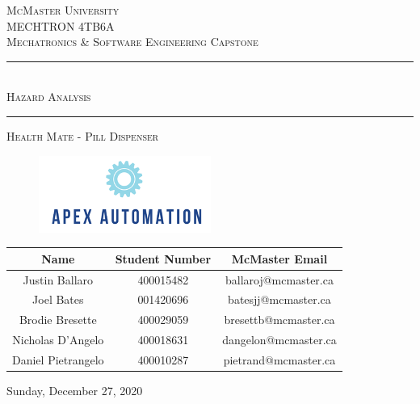 \documentclass[12pt,titlepage]{article}
\begin{document}
\begin{titlepage}

\newcommand{\HRule}{\rule{\linewidth}{0.5mm}} %

\center %
 

\textsc{\LARGE McMaster University}\\[1.5cm] %
\textsc{\Large MECHTRON 4TB6A}\\[0.5cm] %
\textsc{\large Mechatronics \& Software Engineering Capstone}\\[0.5cm] %

\vspace{1cm}
\HRule \\[0.2cm]
{ \Large \vspace{0.25cm}  \textsc{  \LARGE Hazard Analysis } \vspace{0.3cm} }  %
\HRule \vspace{1cm}

\textsc{\LARGE Health Mate - Pill Dispenser}
 
 \begin{figure}[h]
  \centering
  \includegraphics[width=.4\linewidth]{../ApexEngineering.png}
\end{figure}
 \vspace{1cm}
 

\begin{table}[ht!]
\centering
\begin{tabular}{c c c}
\toprule
\textbf{Name} & \textbf{Student Number} & \textbf{McMaster Email}         \\ \midrule
Justin Ballaro & 400015482 & ballaroj@mcmaster.ca \\
Joel Bates & 001420696 & batesjj@mcmaster.ca \\
Brodie Bresette & 400029059 & bresettb@mcmaster.ca \\
Nicholas D'Angelo & 400018631 &  dangelon@mcmaster.ca  \\
Daniel Pietrangelo & 400010287 &  pietrand@mcmaster.ca \\
  \bottomrule
\end{tabular}
\label{Tab:HU}
\end{table}

\vfill
{\large Sunday, December 27, 2020}\\[3cm] %

\end{titlepage}
\end{document}
